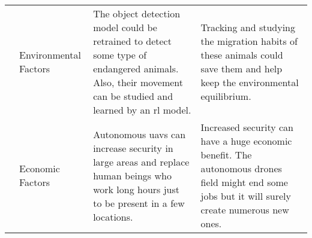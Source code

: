 \documentclass[../main.tex]{subfiles}
\begin{document}
\begin{table}[H]
\begin{tabularx}{\textwidth}{ c p{2.5cm} X X }
	\showimpactcounter
	& Environmental Factors
	& The object detection model could be retrained to detect some 
	type of endangered animals. Also, their movement can be studied and 
	learned by an \gls{rl} model. 
	& Tracking and studying the migration habits of these animals could save 
	them and help keep the environmental equilibrium.  \\
	
	\showimpactcounter
	& Economic Factors  
	& Autonomous \glspl{uav} can increase security in large areas and replace 
	human beings who work long hours just to be present in a few locations. 
	& Increased security can have a huge economic benefit. The autonomous 
	drones field might end some jobs but it will surely create numerous new 
	ones.\\     
	
	\bottomrule		
\end{tabularx}
\end{table}
\end{document}
